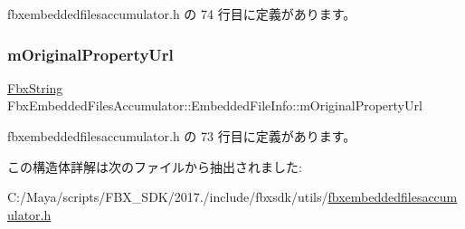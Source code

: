 fbxembeddedfilesaccumulator.\+h の 74 行目に定義があります。

\mbox{\label{struct_fbx_embedded_files_accumulator_1_1_embedded_file_info_a3a7df7013bc1f2a90a3d1b9cad7b52e1}} 
\subsubsection{\texorpdfstring{m\+Original\+Property\+Url}{mOriginalPropertyUrl}}
{\footnotesize\ttfamily \hyperlink{class_fbx_string}{Fbx\+String} Fbx\+Embedded\+Files\+Accumulator\+::\+Embedded\+File\+Info\+::m\+Original\+Property\+Url}



 fbxembeddedfilesaccumulator.\+h の 73 行目に定義があります。



この構造体詳解は次のファイルから抽出されました\+:\begin{DoxyCompactItemize}
\item 
C\+:/\+Maya/scripts/\+F\+B\+X\+\_\+\+S\+D\+K/2017./include/fbxsdk/utils/\hyperlink{fbxembeddedfilesaccumulator_8h}{fbxembeddedfilesaccumulator.\+h}\end{DoxyCompactItemize}
